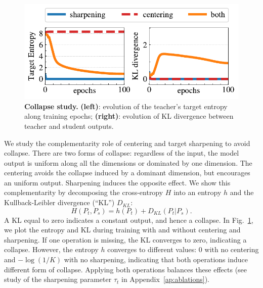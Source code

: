 \begin{figure}[t]
	\centering
  \includegraphics[width=\linewidth]{figure_collapse.pdf}
	\caption{
\textbf{Collapse study.}
    \textbf{(left)}: evolution of the teacher's target entropy along training epochs;
    \textbf{(right)}: evolution of KL divergence between teacher and student outputs.
	}
	\label{fig:collapse}
\end{figure}

We study the complementarity role of centering and target sharpening to avoid collapse.
There are two forms of collapse: regardless of the input, the model output is uniform along all the dimensions or dominated by one dimension. 
The centering avoids the collapse induced by a dominant dimension, but encourages an uniform output.
Sharpening induces the opposite effect.
We show this complementarity by decomposing the cross-entropy $H$ into an entropy $h$ and the Kullback-Leibler divergence (``KL'') $D_{KL}$:
\begin{equation}
  H(P_t, P_s) = h(P_t) + D_{KL}(P_t | P_s).
\end{equation}
A KL equal to zero indicates a constant output, and hence a collapse.
In Fig.~\ref{fig:collapse}, we plot the entropy and KL during training with and without centering and sharpening.
If one operation is missing, the KL converges to zero, indicating a collapse.
However, the entropy $h$ converges to different values: $0$ with no centering and $-\log(1/K)$ with no sharpening, indicating that both operations induce different form of collapse.
Applying both operations balances these effects (see study of the sharpening parameter $\tau_t$ in Appendix~\ref{ap:ablations}).

